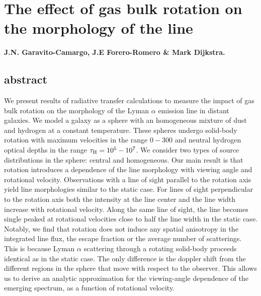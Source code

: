 
\chapter{The effect of gas bulk rotation on the morphology of the \ly line} %

\label{sec:implementation} %


{\bf{J.N. Garavito-Camargo, J.E Forero-Romero \&  Mark Dijkstra.}}

\section*{abstract}
We present results of radiative transfer calculations to measure the
impact of gas bulk rotation on the morphology of the Lyman $\alpha$
emission line in distant galaxies.
We model a galaxy as a sphere with an homogeneous mixture of dust and
hydrogen at a constant temperature.
These spheres undergo solid-body rotation with maximum velocities in
the range $0-300$ \kms and neutral hydrogen optical depths in the
range $\tau_{\rm H}=10^{5}-10^{7}$.
We consider two types of source distributions in the sphere: central and
homogeneous.
Our main result is that rotation introduces a dependence of the
line morphology with viewing angle and rotational velocity.
Observations with a line of sight parallel to the rotation axis yield
line morphologies similar to the static case.
For lines of sight perpendicular to the rotation axis both the intensity at the line
center and the line width increase with rotational velocity.
Along the same line of sight, the line becomes single peaked at rotational
velocities close to half the line width in the static case.
Notably, we find that rotation does not induce any spatial anisotropy in the integrated line flux, the escape fraction or the average number of scatterings. This is because Lyman $\alpha$ scattering through a rotating solid-body proceeds identical as in the static case. The only difference is the doppler shift from the different
regions in the sphere that move with respect to the observer. This
allows us to derive an analytic approximation for the viewing-angle
dependence of the emerging spectrum, as a function of rotational velocity.

